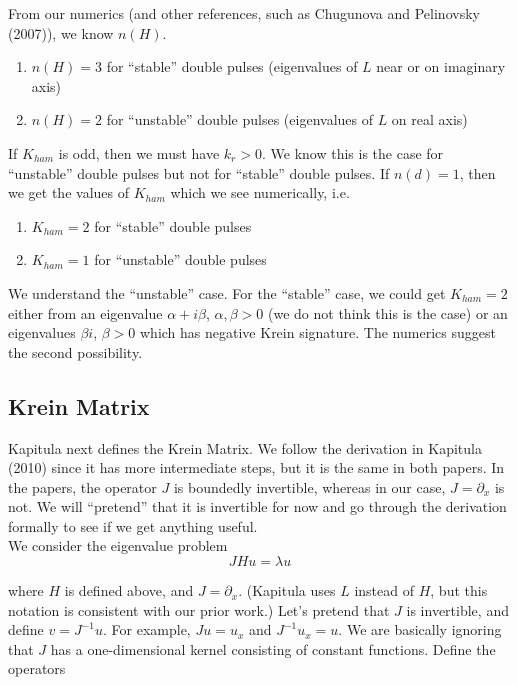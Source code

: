 \documentclass[12pt]{article}
\begin{document}
From our numerics (and other references, such as Chugunova and Pelinovsky (2007)), we know $n(H)$.

\begin{enumerate}
	\item $n(H) = 3$ for ``stable'' double pulses (eigenvalues of $L$ near or on imaginary axis)
	\item $n(H) = 2$ for ``unstable'' double pulses (eigenvalues of $L$ on real axis)
\end{enumerate}

If $K_{ham}$ is odd, then we must have $k_r > 0$. We know this is the case for ``unstable'' double pulses but not for ``stable'' double pulses. If $n(d) = 1$, then we get the values of $K_{ham}$ which we see numerically, i.e.

\begin{enumerate}
	\item $K_{ham} = 2$ for ``stable'' double pulses
	\item $K_{ham} = 1$ for ``unstable'' double pulses
\end{enumerate}

We understand the ``unstable'' case. For the ``stable'' case, we could get $K_{ham} = 2$ either from an eigenvalue $\alpha + i \beta$, $\alpha, \beta > 0$ (we do not think this is the case) or an eigenvalues $\beta i$, $\beta > 0$ which has negative Krein signature. The numerics suggest the second possibility.

\subsection{Krein Matrix}

Kapitula next defines the Krein Matrix. We follow the derivation in Kapitula (2010) since it has more intermediate steps, but it is the same in both papers. In the papers, the operator $J$ is boundedly invertible, whereas in our case, $J = \partial_x$ is not. We will ``pretend'' that it is invertible for now and go through the derivation formally to see if we get anything useful.\\

We consider the eigenvalue problem
\[
J H u = \lambda u
\]

where $H$ is defined above, and $J = \partial_x$. (Kapitula uses $L$ instead of $H$, but this notation is consistent with our prior work.) Let's pretend that $J$ is invertible, and define $v = J^{-1}u$. For example, $Ju = u_x$ and $J^{-1}u_x = u$. We are basically ignoring that $J$ has a one-dimensional kernel consisting of constant functions. Define the operators
\end{document}
